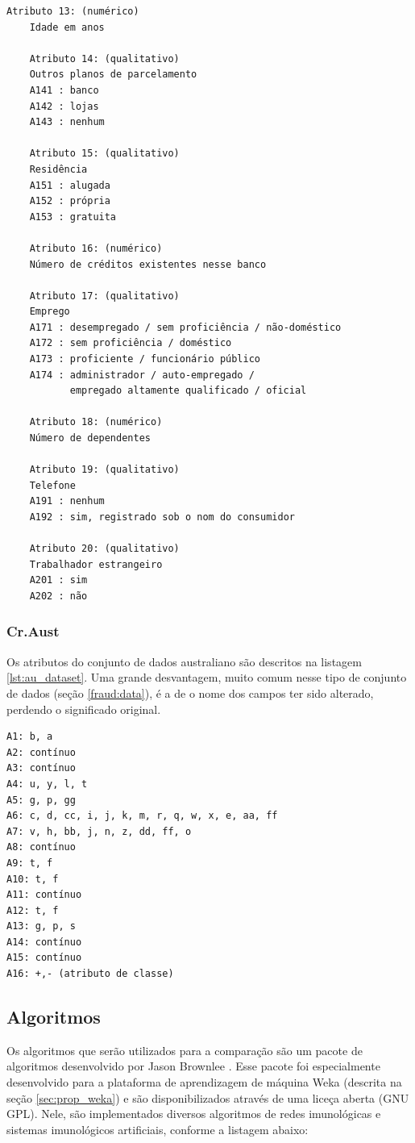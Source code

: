 \begin{lstlisting}[caption=Atributos do conjunto de dados alemão,label=lst:ge_dataset]
    Atributo 13: (numérico)
    Idade em anos

    Atributo 14: (qualitativo)
    Outros planos de parcelamento
    A141 : banco
    A142 : lojas
    A143 : nenhum

    Atributo 15: (qualitativo)
    Residência
    A151 : alugada
    A152 : própria
    A153 : gratuita

    Atributo 16: (numérico)
    Número de créditos existentes nesse banco

    Atributo 17: (qualitativo)
    Emprego
    A171 : desempregado / sem proficiência / não-doméstico
    A172 : sem proficiência / doméstico
    A173 : proficiente / funcionário público
    A174 : administrador / auto-empregado /
           empregado altamente qualificado / oficial

    Atributo 18: (numérico)
    Número de dependentes

    Atributo 19: (qualitativo)
    Telefone
    A191 : nenhum
    A192 : sim, registrado sob o nom do consumidor

    Atributo 20: (qualitativo)
    Trabalhador estrangeiro
    A201 : sim
    A202 : não
\end{lstlisting}

\subsubsection{Cr.Aust}

Os atributos do conjunto de dados australiano são descritos na listagem \ref{lst:au_dataset}. Uma grande desvantagem, muito comum nesse tipo de conjunto de dados (seção \ref{fraud:data}), é a de o nome dos campos ter sido alterado, perdendo o significado original.

\begin{lstlisting}[caption=Atributos do conjunto de dados australiano ,label=lst:au_dataset]
A1: b, a
A2: contínuo
A3: contínuo
A4: u, y, l, t
A5: g, p, gg
A6: c, d, cc, i, j, k, m, r, q, w, x, e, aa, ff
A7: v, h, bb, j, n, z, dd, ff, o
A8: contínuo
A9: t, f
A10: t, f
A11: contínuo
A12: t, f
A13: g, p, s
A14: contínuo
A15: contínuo
A16: +,- (atributo de classe)
\end{lstlisting}

\subsection{Algoritmos}

Os algoritmos que serão utilizados para a comparação são um pacote de algoritmos desenvolvido por Jason Brownlee \cite{Brownlee2007}. Esse pacote foi especialmente desenvolvido para a plataforma de aprendizagem de máquina Weka (descrita na seção \ref{sec:prop_weka}) e são disponibilizados através de uma liceça aberta (GNU GPL). Nele, são implementados diversos algoritmos de redes imunológicas e sistemas imunológicos artificiais, conforme a listagem abaixo:

